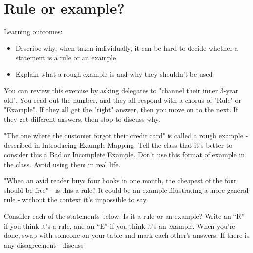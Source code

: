 \chapter*{Rule or example?}

\ifnotes
    Learning outcomes:
    
    \begin{itemize}
        \item Describe why, when taken individually, it can be hard to decide whether a statement is a rule or an example
        \item Explain what a rough example is and why they shouldn't be used
    \end{itemize}
    
    You can review this exercise by asking delegates to "channel their inner 3-year old". You read out the number, and they all respond with a chorus of "Rule" or "Example". If they all get the "right" answer, then you move on to the next. If they get different answers, then stop to discuss why.
    
    "The one where the customer forgot their credit card" is called a rough example - described in Introducing Example Mapping. Tell the class that it's better to consider this a Bad or Incomplete Example. Don't use this format of example in the class. Avoid using them in real life.
    
    "When an avid reader buys four books in one month, the cheapest of the four should be free" - is this a rule? It could be an example illustrating a more general rule - without the context it's impossible to say.

\fi

\ifcontent
    Consider each of the statements below. Is it a rule or an example? Write an “R” if you think it's a rule, and an “E” if you think it's an example. When you're done, swap with someone on your table and mark each other's answers. If there is any disagreement - discuss!
    
